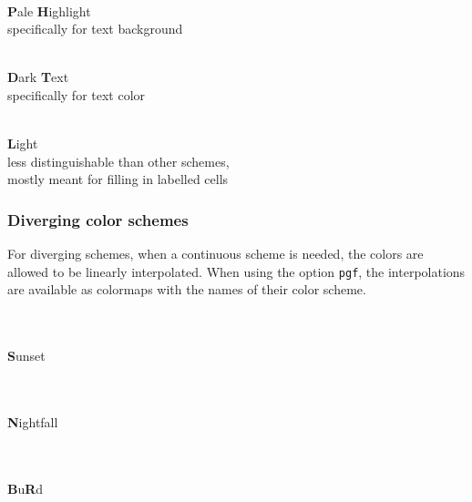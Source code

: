 \documentclass{scrartcl}
\begin{document}
\begin{minipage}{0.5\textwidth}
    \centering
    \\
    \textbf{P}ale \textbf{H}ighlight\\
    specifically for text background
\end{minipage}\hfill%
\begin{minipage}{0.5\textwidth}
    \centering
    \\
    \textbf{D}ark \textbf{T}ext\\
    specifically for text color
\end{minipage}

\begin{center}
    \\
    \textbf{L}ight\\
    less distinguishable than other schemes,\\ mostly meant for filling in labelled cells
\end{center}\clearpage

\subsubsection{Diverging color schemes}\label{sec:T-D}
For diverging schemes, when a continuous scheme is needed, the colors are allowed to be linearly interpolated.
When using the option \verb!pgf!, the interpolations are available as colormaps with the names of their color scheme.

\begin{center}
    \\
    \\
    \textbf{S}unset
\end{center}

\begin{center}
    \\
    \\
    \textbf{N}ightfall
\end{center}

\begin{center}
    \\
    \\
    \textbf{B}u\textbf{R}d
\end{center}
\end{document}
